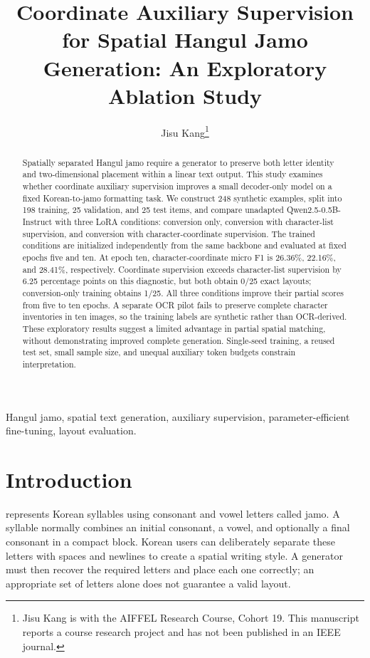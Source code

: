 \documentclass[journal]{IEEEtran}
\title{Coordinate Auxiliary Supervision for Spatial Hangul Jamo Generation: An Exploratory Ablation Study}
\author{Jisu Kang\thanks{Jisu Kang is with the AIFFEL Research Course, Cohort 19. This manuscript reports a course research project and has not been published in an IEEE journal.}}
\begin{document}
\maketitle
\begin{abstract}
Spatially separated Hangul jamo require a generator to preserve both letter identity and two-dimensional placement within a linear text output. This study examines whether coordinate auxiliary supervision improves a small decoder-only model on a fixed Korean-to-jamo formatting task. We construct 248 synthetic examples, split into 198 training, 25 validation, and 25 test items, and compare unadapted Qwen2.5-0.5B-Instruct with three LoRA conditions: conversion only, conversion with character-list supervision, and conversion with character-coordinate supervision. The trained conditions are initialized independently from the same backbone and evaluated at fixed epochs five and ten. At epoch ten, character-coordinate micro F1 is 26.36\%, 22.16\%, and 28.41\%, respectively. Coordinate supervision exceeds character-list supervision by 6.25 percentage points on this diagnostic, but both obtain 0/25 exact layouts; conversion-only training obtains 1/25. All three conditions improve their partial scores from five to ten epochs. A separate OCR pilot fails to preserve complete character inventories in ten images, so the training labels are synthetic rather than OCR-derived. These exploratory results suggest a limited advantage in partial spatial matching, without demonstrating improved complete generation. Single-seed training, a reused test set, small sample size, and unequal auxiliary token budgets constrain interpretation.
\end{abstract}
\begin{IEEEkeywords}
Hangul jamo, spatial text generation, auxiliary supervision, parameter-efficient fine-tuning, layout evaluation.
\end{IEEEkeywords}

\section{Introduction}
 represents Korean syllables using consonant and vowel letters called jamo. A syllable normally combines an initial consonant, a vowel, and optionally a final consonant in a compact block. Korean users can deliberately separate these letters with spaces and newlines to create a spatial writing style. A generator must then recover the required letters and place each one correctly; an appropriate set of letters alone does not guarantee a valid layout.
\end{document}
